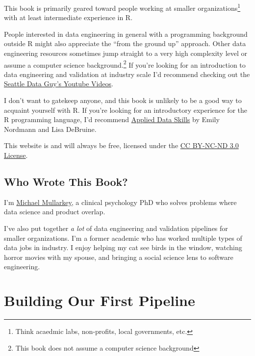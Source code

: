 \documentclass[
  letterpaper,
  DIV=11,
  numbers=noendperiod]{scrreprt}
\begin{document}
This book is primarily geared toward people working at smaller
organizations\footnote{Think acaedmic labs, non-profits, local
  governments, etc.} with at least intermediate experience in R.

People interested in data engineering in general with a programming
background outside R might also appreciate the ``from the ground up''
approach. Other data engineering resources sometimes jump straight to a
very high complexity level or assume a computer science
background.\footnote{This book does not assume a computer science
  background} If you're looking for an introduction to data engineering
and validation at industry scale I'd recommend checking out the
\href{https://www.youtube.com/@SeattleDataGuy/videos}{Seattle Data Guy's
Youtube Videos}.

I don't want to gatekeep anyone, and this book is unlikely to be a good
way to acquaint yourself with R. If you're looking for an introductory
experience for the R programming language, I'd recommend
\href{https://psyteachr.github.io/ads-v2/}{Applied Data Skills} by Emily
Nordmann and Lisa DeBruine.

This website is and will always be free, licensed under the
\href{https://creativecommons.org/licenses/by-nc-nd/3.0/us/}{CC BY-NC-ND
3.0 License}.

\hypertarget{who-wrote-this-book}{%
\section*{Who Wrote This Book?}\label{who-wrote-this-book}}

I'm \href{https://mcmullarkey.github.io/}{Michael Mullarkey}, a clinical
psychology PhD who solves problems where data science and product
overlap.

I've also put together \emph{a lot} of data engineering and validation
pipelines for smaller organizations. I'm a former academic who has
worked multiple types of data jobs in industry. I enjoy helping my cat
see birds in the window, watching horror movies with my spouse, and
bringing a social science lens to software engineering.


\hypertarget{building-our-first-pipeline}{%
\chapter{Building Our First
Pipeline}\label{building-our-first-pipeline}}
\end{document}
